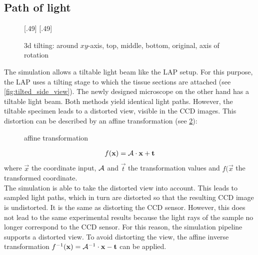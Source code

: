 \subsection{Path of light}
\label{sec:pathOfLight}
% 
\begin{figure}[!t]
\def\tikzheight{0.42\textwidth}
[.49\textwidth]{
}\hfill
{}[.49\textwidth]{
}
\tikzset{external/export=false}
\caption[3d tilting]{3d tilting: around $xy$-axis, \raisebox{.25em}{\tikz \draw[red,thick](0,0)--(0.25,0);} top, \raisebox{.25em}{\tikz \draw[green,thick](0,0)--(0.25,0);} middle, \raisebox{.25em}{\tikz \draw[blue,thick](0,0)--(0.25,0);} bottom, \raisebox{.25em}{\tikz \draw[dash pattern=on 1.25pt off 1.25pt,thick](0,0)--(0.25,0);} original, \raisebox{.25em}{\tikz \draw[gray](0,0)--(0.25,0);} axis of rotation }
\label{fig:tilting_camera_view}
\end{figure}
% 
The simulation allows a tiltable light beam like the \ac{LAP} setup.
For this purpose, the \ac{LAP} uses a tilting stage to which the tissue sections are attached (see \cref{fig:tilted_side_view}). 
The newly designed microscope on the other hand has a tiltable light beam.
Both methods yield identical light paths.
However, the tiltable specimen leads to a distorted view, visible in the \ac{CCD} images.
This distortion can be described by an affine transformation (see \cref{fig::affine_transformation}):
% 
\begin{figure}[!t]
\centering

\caption{affine transformation}
\label{fig::affine_transformation}
\end{figure}
% 
\begin{align}
f(\mathbf{x}) = \mathcal{A} \cdot \mathbf{x} + \mathbf{t}
\end{align}
where $\vec{x}$ the coordinate input, $\mathcal{A}$ and $\vec{t}$ the transformation values and $f(\vec{x}$ the transformed coordinate.
\\
% 
The simulation is able to take the distorted view into account.
This leads to sampled light paths, which in turn are distorted so that the resulting \ac{CCD} image is undistorted.
It is the same as distorting the \ac{CCD} sensor.
However, this does not lead to the same experimental results because the light rays of the sample no longer correspond to the \ac{CCD} sensor.
For this reason, the simulation pipeline supports a distorted view.
To avoid distorting the view, the affine inverse transformation $f^{-1}(\mathbf{x}) = \mathcal{A}^{-1} \cdot \mathbf{x} - \mathbf{t}$ can be applied.

